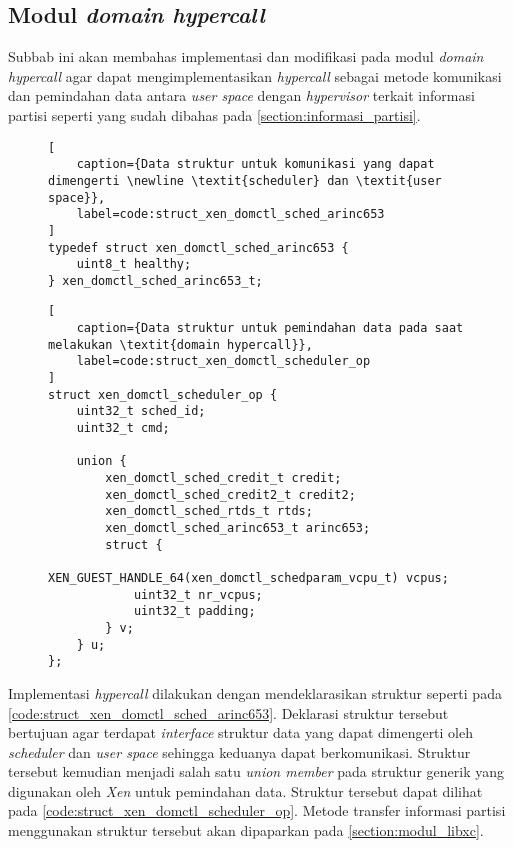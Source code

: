 \subsection{Modul \textit{domain hypercall}}
\label{section:modul_public_hypercall}

Subbab ini akan membahas implementasi dan modifikasi pada modul \textit{domain hypercall} agar
dapat mengimplementasikan \textit{hypercall} sebagai metode komunikasi dan pemindahan data
antara \textit{user space} dengan \textit{hypervisor} terkait informasi partisi seperti yang
sudah dibahas pada \autoref{section:informasi_partisi}.

\begin{figure}
\begin{lstlisting}[
	caption={Data struktur untuk komunikasi yang dapat dimengerti \newline \textit{scheduler} dan \textit{user space}},
	label=code:struct_xen_domctl_sched_arinc653
]
typedef struct xen_domctl_sched_arinc653 {
    uint8_t healthy;
} xen_domctl_sched_arinc653_t;
\end{lstlisting}
\end{figure}

\begin{figure}
\begin{lstlisting}[
	caption={Data struktur untuk pemindahan data pada saat melakukan \textit{domain hypercall}},
	label=code:struct_xen_domctl_scheduler_op
]
struct xen_domctl_scheduler_op {
    uint32_t sched_id;
    uint32_t cmd;

    union {
        xen_domctl_sched_credit_t credit;
        xen_domctl_sched_credit2_t credit2;
        xen_domctl_sched_rtds_t rtds;
        xen_domctl_sched_arinc653_t arinc653;
        struct {
            XEN_GUEST_HANDLE_64(xen_domctl_schedparam_vcpu_t) vcpus;
            uint32_t nr_vcpus;
            uint32_t padding;
        } v;
    } u;
};
\end{lstlisting}
\end{figure}

Implementasi \textit{hypercall} dilakukan dengan mendeklarasikan struktur seperti pada
\autoref{code:struct_xen_domctl_sched_arinc653}. Deklarasi struktur tersebut bertujuan agar
terdapat \textit{interface} struktur data yang dapat dimengerti oleh \textit{scheduler} dan
\textit{user space} sehingga keduanya dapat berkomunikasi. Struktur tersebut kemudian menjadi
salah satu \textit{union member} pada struktur generik yang digunakan oleh \textit{Xen} untuk
pemindahan data. Struktur tersebut dapat dilihat pada
\autoref{code:struct_xen_domctl_scheduler_op}. Metode transfer informasi partisi menggunakan
struktur tersebut akan dipaparkan pada \autoref{section:modul_libxc}.

